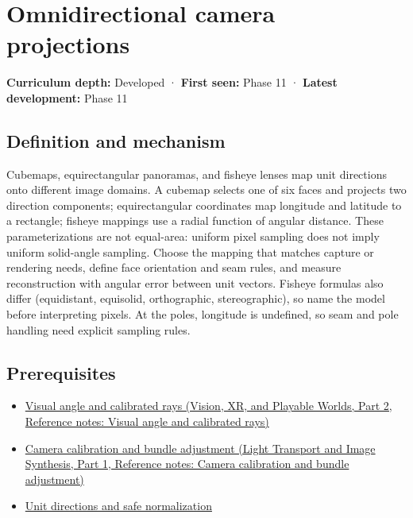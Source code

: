 \hypertarget{appendix-fc99ad39f351}{}\label{referencestart:appendix-fc99ad39f351}
\section{Omnidirectional camera projections}\label{appendix-fc99ad39f351-omnidirectional-camera-projections}

\hypertarget{appendix-fc99ad39f351-omnidirectional-camera-projections}{}

\textbf{Curriculum depth:} Developed · \textbf{First seen:} Phase 11 · \textbf{Latest development:} Phase 11

\begin{allmightroledefinition}

\subsection{Definition and mechanism}\label{appendix-fc99ad39f351-definition-and-mechanism}

\hypertarget{appendix-fc99ad39f351-definition-and-mechanism}{}

Cubemaps, equirectangular panoramas, and fisheye lenses map unit directions onto different image domains. A cubemap selects one of six faces and projects two direction components; equirectangular coordinates map longitude and latitude to a rectangle; fisheye mappings use a radial function of angular distance. These parameterizations are not equal-area: uniform pixel sampling does not imply uniform solid-angle sampling. Choose the mapping that matches capture or rendering needs, define face orientation and seam rules, and measure reconstruction with angular error between unit vectors. Fisheye formulas also differ (equidistant, equisolid, orthographic, stereographic), so name the model before interpreting pixels. At the poles, longitude is undefined, so seam and pole handling need explicit sampling rules.

\end{allmightroledefinition}

\subsection{Prerequisites}\label{appendix-fc99ad39f351-prerequisites}

\hypertarget{appendix-fc99ad39f351-prerequisites}{}

\begin{itemize}
\tightlist
\item
  \href{../07-Vision-XR-and-Playable-Worlds-P02/main.pdf\#appendix-7d356c396d1a}{Visual angle and calibrated rays (Vision, XR, and Playable Worlds, Part 2, Reference notes: Visual angle and calibrated rays)}
\item
  \href{../04-Light-Transport-and-Image-Synthesis-P01/main.pdf\#appendix-3ee9861904d5}{Camera calibration and bundle adjustment (Light Transport and Image Synthesis, Part 1, Reference notes: Camera calibration and bundle adjustment)}
\item
  \hyperref[appendix-f744e41b95b4]{Unit directions and safe normalization}
\end{itemize}

